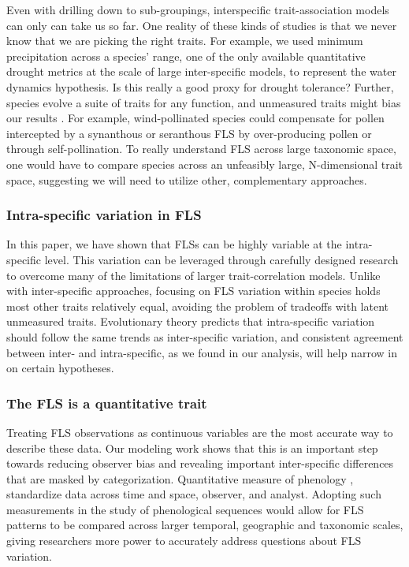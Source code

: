 \documentclass[12pt]{article}\usepackage[]{graphicx}\usepackage[]{color}
\begin{document}
\indent Even with drilling down to sub-groupings, interspecific trait-association models can only can take us so far. One reality of these kinds of studies is that we never know that we are picking the right traits. For example, we used minimum precipitation across a species' range, one of the only available quantitative drought metrics at the scale of large inter-specific models, to represent the water dynamics hypothesis. Is this really a good proxy for drought tolerance? Further, species evolve a suite of traits for any function, and unmeasured traits might bias our results \citep{Davies2019}. For example, wind-pollinated species could compensate for pollen intercepted by a synanthous or seranthous FLS by over-producing pollen or through self-pollination. To really understand FLS across large taxonomic space, one would have to compare species across an unfeasibly large, N-dimensional trait space, suggesting we will need to utilize other, complementary approaches.\\%

\subsubsection*{Intra-specific variation in FLS}
\indent\indent In this paper, we have shown that FLSs can be highly variable at the intra-specific level. This variation can be leveraged through carefully designed research to overcome many of the limitations of larger trait-correlation models. Unlike with inter-specific approaches, focusing on FLS variation within species holds most other traits relatively equal, avoiding the problem of tradeoffs with latent unmeasured traits. Evolutionary theory predicts that intra-specific variation should follow the same trends as inter-specific variation, and consistent agreement between inter- and intra-specific, as we found in our analysis, will help narrow in on certain hypotheses.\\
\subsubsection*{The FLS is a quantitative trait}
\indent \indent Treating FLS observations as continuous variables are the most accurate way to describe these data. Our modeling work shows that this is an important step towards reducing observer bias and revealing important inter-specific differences that are masked by categorization. Quantitative measure of phenology \citep[e.g. the BBCH scale,][]{Finn2007}, standardize data across time and space, observer, and analyst. Adopting such measurements in the study of phenological sequences would allow for FLS patterns to be compared across larger temporal, geographic and taxonomic scales, giving researchers more power to accurately address questions about FLS variation.
\end{document}
